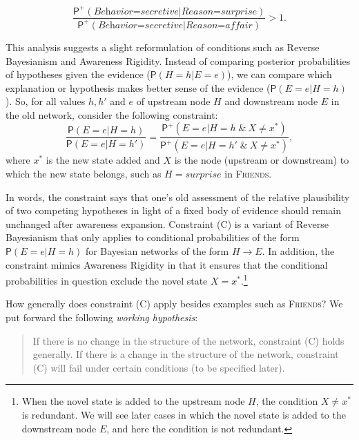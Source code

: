 \documentclass[
  11pt,
  dvipsnames,enabledeprecatedfontcommands]{scrartcl}
\newcommand{\pr}[1]{\ensuremath{\mathsf{P}(#1)}}
\newcommand{\ppr}[2]{\ensuremath{\mathsf{P}^{#1}(#2)}}
\begin{document}
\[\frac{\ppr{+}{\textit{Behavior=secretive} \vert \textit{Reason=surprise}}}{\ppr{+}{\textit{Behavior=secretive} \vert \textit{Reason=affair}}}>1. \]

This analysis suggests a slight reformulation of conditions such as
Reverse Bayesianism and Awareness Rigidity. Instead of comparing
posterior probabilities of hypotheses given the evidence
(\(\pr{H=h \vert E=e}\)), we can compare which explanation or hypothesis
makes better sense of the evidence (\(\pr{E=e \vert H=h}\)). So, for all
values \(h, h'\) and \(e\) of upstream node \(H\) and downstream node
\(E\) in the old network, consider the following constraint:
\[\frac{\pr{E=e \vert H=h}}{\pr{E=e \vert H=h'}} = \frac{\ppr{+}{E=e \vert H=h  \; \& \: X\neq x^*}}{\ppr{+}{E=e \vert H=h'  \; \& \: X\neq x^*}}, \tag{C}\]
where \(x^*\) is the new state added and \(X\) is the node (upstream or
downstream) to which the new state belongs, such as
\(H=\textit{surprise}\) in \textsc{Friends}.

In words, the constraint says that one's old assessment of the relative
plausibility of two competing hypotheses in light of a fixed body of
evidence should remain unchanged after awareness expansion. Constraint
(C) is a variant of Reverse Bayesianism that only applies to conditional
probabilities of the form \(\pr{E=e \vert H=h}\) for Bayesian networks
of the form \(H \rightarrow E\). In addition, the constraint mimics
Awareness Rigidity in that it ensures that the conditional probabilities
in question exclude the novel state \(X=x^*\).\footnote{When the novel
  state is added to the upstream node \(H\), the condition \(X\neq x^*\)
  is redundant. We will see later cases in which the novel state is
  added to the downstream node \(E\), and here the condition is not
  redundant.}

How generally does constraint (C) apply besides examples such as
\textsc{Friends}? We put forward the following \emph{working
hypothesis}:

\begin{quote}
If there is no change in the structure of the network, constraint (C)
holds generally. If there is a change in the structure of the network,
constraint (C) will fail under certain conditions (to be specified
later).
\end{quote}
\end{document}
